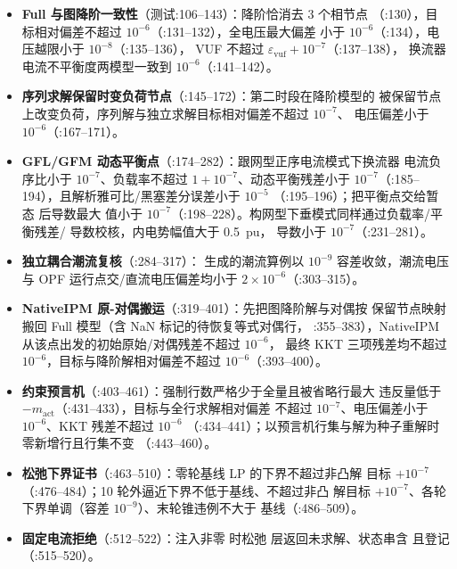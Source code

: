\begin{itemize}
  \item \textbf{Full 与图降阶一致性}（测试:106--143）：降阶恰消去 3 个相节点
        （:130），目标相对偏差不超过 $10^{-6}$（:131--132），全电压最大偏差
        小于 $10^{-6}$（:134），电压越限小于 $10^{-8}$（:135--136），
        VUF 不超过 $\varepsilon_{\mathrm{vuf}}+10^{-7}$（:137--138），
        换流器电流不平衡度两模型一致到 $10^{-6}$（:141--142）。
  \item \textbf{序列求解保留时变负荷节点}（:145--172）：第二时段在降阶模型的
        被保留节点上改变负荷，序列解与独立求解目标相对偏差不超过 $10^{-7}$、
        电压偏差小于 $10^{-6}$（:167--171）。
  \item \textbf{GFL/GFM 动态平衡点}（:174--282）：跟网型正序电流模式下换流器
        电流负序比小于 $10^{-7}$、负载率不超过 $1+10^{-7}$、动态平衡残差小于
        $10^{-7}$（:185--194），且解析雅可比/黑塞差分误差小于 $10^{-5}$
        （:195--196）；把平衡点交给暂态  后导数最大
        值小于 $10^{-7}$（:198--228）。构网型下垂模式同样通过负载率/平衡残差/
        导数校核，内电势幅值大于 0.5~pu， 导数小于
        $10^{-7}$（:231--281）。
  \item \textbf{独立耦合潮流复核}（:284--317）：
         生成的潮流算例以
        $10^{-9}$ 容差收敛，潮流电压与 OPF 运行点交/直流电压偏差均小于
        $2\times10^{-6}$（:303--315）。
  \item \textbf{NativeIPM 原-对偶搬运}（:319--401）：先把图降阶解与对偶按
        保留节点映射搬回 Full 模型（含 NaN 标记的待恢复等式对偶行，
        :355--383），NativeIPM 从该点出发的初始原始/对偶残差不超过 $10^{-6}$，
        最终 KKT 三项残差均不超过 $10^{-6}$，目标与降阶解相对偏差不超过
        $10^{-6}$（:393--400）。
  \item \textbf{约束预言机}（:403--461）：强制行数严格少于全量且被省略行最大
        违反量低于 $-m_{\mathrm{act}}$（:431--433），目标与全行求解相对偏差
        不超过 $10^{-7}$、电压偏差小于 $10^{-6}$、KKT 残差不超过 $10^{-6}$
        （:434--441）；以预言机行集与解为种子重解时零新增行且行集不变
        （:443--460）。
  \item \textbf{松弛下界证书}（:463--510）：零轮基线 LP 的下界不超过非凸解
        目标 $+10^{-7}$（:476--484）；10 轮外逼近下界不低于基线、不超过非凸
        解目标 $+10^{-7}$、各轮下界单调（容差 $10^{-9}$）、末轮锥违例不大于
        基线（:486--509）。
  \item \textbf{固定电流拒绝}（:512--522）：注入非零  时松弛
        层返回未求解、状态串含  且登记
        （:515--520）。
\end{itemize}

